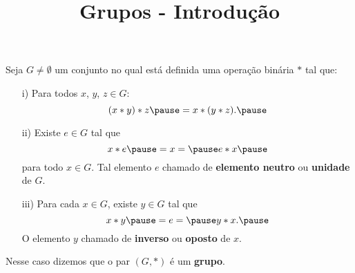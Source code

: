\documentclass{beamer}
\title{Grupos - Introdu\c{c}\~ao}
\author[\autor]{\autor}
\institute[\instituto]{\instituto}
\date{}
\begin{document}
    \begin{frame}
        \maketitle
    \end{frame}


    \begin{frame}
        \begin{definicao}
            Seja $G \ne \emptyset$ \pause um conjunto no qual est\'a definida uma opera{\c c}{\~a}o bin{\'a}ria $*$ \pause tal que:\pause
            \begin{enumerate}
                \item[i)] Para todos $x$, $y$, $z\in G$:\pause
                \[
                    (x*y)*z \pause = x*(y*z).\pause
                \]

                \item[ii)] Existe $e \in G$ \pause tal que\pause
                \[
                    x*e \pause = x = \pause e*x\pause
                \]
                para todo $x \in G$. \pause Tal elemento $e$  chamado de \textbf{elemento neutro} \pause ou \textbf{unidade} \pause de $G$.\pause

            \end{enumerate}
        \end{definicao}
    \end{frame}

    \begin{frame}
        \begin{definicao}
            \begin{enumerate}
                \item[iii)] Para cada $x \in G$, \pause existe $y \in G$ \pause tal que\pause
                \[
                    x*y \pause = e = \pause y*x.\pause
                \]
                O elemento $y$  chamado de \textbf{inverso} \pause ou \textbf{oposto} \pause de $x$.\pause
            \end{enumerate}
            Nesse caso dizemos que o par $(G, *)$ \pause \'e um \textbf{grupo}.\pause
        \end{definicao}
    \end{frame}
\end{document}
